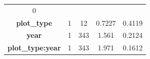 \documentclass[]{article}
\begin{document}
\begin{longtable}[c]{@{}ccccc@{}}
\begin{minipage}[t]{0.12\columnwidth}
0
\strut\end{minipage}\tabularnewline
\begin{minipage}[t]{0.25\columnwidth}\centering\strut
\textbf{plot\_type}
\strut\end{minipage} &
\begin{minipage}[t]{0.10\columnwidth}\centering\strut
1
\strut\end{minipage} &
\begin{minipage}[t]{0.10\columnwidth}\centering\strut
12
\strut\end{minipage} &
\begin{minipage}[t]{0.12\columnwidth}\centering\strut
0.7227
\strut\end{minipage} &
\begin{minipage}[t]{0.12\columnwidth}\centering\strut
0.4119
\strut\end{minipage}\tabularnewline
\begin{minipage}[t]{0.25\columnwidth}\centering\strut
\textbf{year}
\strut\end{minipage} &
\begin{minipage}[t]{0.10\columnwidth}\centering\strut
1
\strut\end{minipage} &
\begin{minipage}[t]{0.10\columnwidth}\centering\strut
343
\strut\end{minipage} &
\begin{minipage}[t]{0.12\columnwidth}\centering\strut
1.561
\strut\end{minipage} &
\begin{minipage}[t]{0.12\columnwidth}\centering\strut
0.2124
\strut\end{minipage}\tabularnewline
\begin{minipage}[t]{0.25\columnwidth}\centering\strut
\textbf{plot\_type:year}
\strut\end{minipage} &
\begin{minipage}[t]{0.10\columnwidth}\centering\strut
1
\strut\end{minipage} &
\begin{minipage}[t]{0.10\columnwidth}\centering\strut
343
\strut\end{minipage} &
\begin{minipage}[t]{0.12\columnwidth}\centering\strut
1.971
\strut\end{minipage} &
\begin{minipage}[t]{0.12\columnwidth}\centering\strut
0.1612
\strut\end{minipage}\tabularnewline
\bottomrule
\end{longtable}
\end{document}
